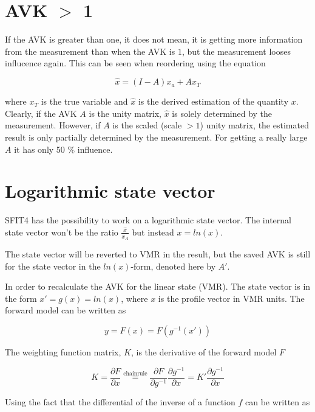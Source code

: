 \documentclass[a4paper]{article}
\begin{document}
\section{AVK $>$ 1}

If the AVK is greater than one, it does not mean, it is getting more information from the measurement than when the AVK is $1$, but the
measurement looses influcence again. This can be seen when reordering using the equation 

\begin{equation}
  \hat{x} = (I - A) x_a + A x_T
\end{equation}

where $x_T$ is the true variable and $\hat{x}$ is the derived estimation of the quantity $x$. Clearly, if the AVK $A$ is the unity matrix, $\hat{x}$ is solely determined by the measurement. However, if $A$ is the scaled (scale $>1$) unity matrix, the estimated result is only partially determined by the measurement. For getting a really large $A$ it has only 50 \% influence.


\section{Logarithmic state vector}

SFIT4 has the possibility to work on a logarithmic state vector. The internal state vector won't be the ratio $\frac{\hat{x}}{x_A}$ but instead $x = ln(x)$.

The state vector will be reverted to VMR in the result, but the saved AVK is still for the state vector in the
$ln(x)$-form, denoted here by $A'$.

In order to recalculate the AVK for the linear state (VMR). The state vector is in the form $x' = g(x) = ln(x)$, where $x$ is the profile vector in VMR units. The forward model can be written as

\begin{equation}
  y = F(x) = F(g^{-1}(x'))  
\end{equation}

The weighting function matrix, $K$, is the derivative of the forward model $F$ 

\begin{equation}
  K = \frac{\partial F}{\partial x} \stackrel{\mathrm{chain rule}}{=}
  \frac{\partial F}{\partial g^{-1}}\frac{\partial g^{-1}}{\partial x} = K'  \frac{\partial g^{-1}}{\partial x}
\end{equation}

Using the fact that the differential of the inverse of a function $f$ can be written as 
\end{document}
